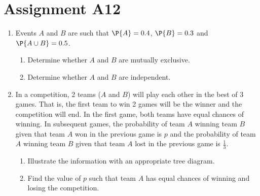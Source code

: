 \section{Assignment A12}

\begin{problem}
    \begin{enumerate}
        \item Events $A$ and $B$ are such that $\P{A} = 0.4$, $\P{B} = 0.3$ and $\P{A \cup B} = 0.5$.
        \begin{enumerate}
            \item Determine whether $A$ and $B$ are mutually exclusive.
            \item Determine whether $A$ and $B$ are independent.
        \end{enumerate}
        \item In a competition, 2 teams ($A$ and $B$) will play each other in the best of 3 games. That is, the first team to win 2 games will be the winner and the competition will end. In the first game, both teams have equal chances of winning. In subsequent games, the probability of team $A$ winning team $B$ given that team $A$ won in the previous game is $p$ and the probability of team $A$ winning team $B$ given that team $A$ lost in the previous game is $\frac13$.
        \begin{enumerate}
            \item Illustrate the information with an appropriate tree diagram.
            \item Find the value of $p$ such that team $A$ has equal chances of winning and losing the competition.
        \end{enumerate}
    \end{enumerate}   
\end{problem}

